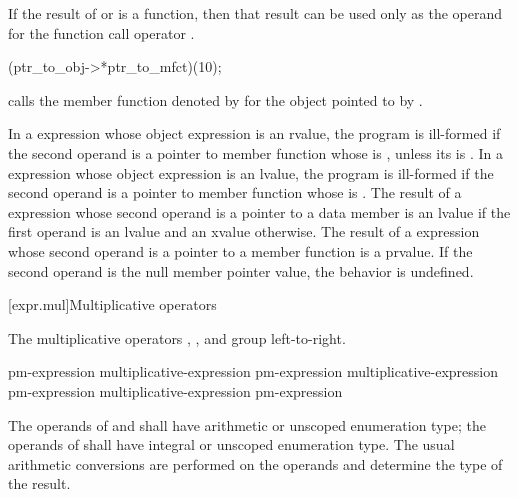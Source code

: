 \pnum
{}%
If the result of  or \tcode{->*} is a function, then that
result can be used only as the operand for the function call operator
\tcode{()}.
\begin{example}
\begin{codeblock}
(ptr_to_obj->*ptr_to_mfct)(10);
\end{codeblock}
calls the member function denoted by  for the object
pointed to by .
\end{example}
In a  expression whose object expression is an rvalue, the program is
ill-formed if the second operand is a pointer to member function
whose  is \tcode{\&},
unless its  is .
In a 
expression whose object expression is an lvalue, the program is ill-formed if the second
operand is
a pointer to member function
whose  is \tcode{\&\&}.
The result of a  expression
whose second operand is a pointer to a data member is an lvalue if the first
operand is an lvalue and an xvalue otherwise. The result of a  expression whose
second operand is a pointer to a member function is a prvalue.
If the second operand is the null
member pointer value, the behavior is undefined.

[expr.mul]{Multiplicative operators}%
%

\pnum
The multiplicative operators \tcode{*}, \tcode{/}, and \tcode{\%} group
left-to-right.

%
%
%
%
%
%
%
%
\begin{bnf}
\br
    pm-expression\br
    multiplicative-expression \terminal{*} pm-expression\br
    multiplicative-expression \terminal{/} pm-expression\br
    multiplicative-expression \terminal{\%} pm-expression
\end{bnf}

\pnum
The operands of \tcode{*} and \tcode{/} shall have arithmetic or unscoped
enumeration type; the operands of \tcode{\%} shall have integral or unscoped
enumeration type. The usual arithmetic conversions are performed on the
operands and determine the type of the result.

